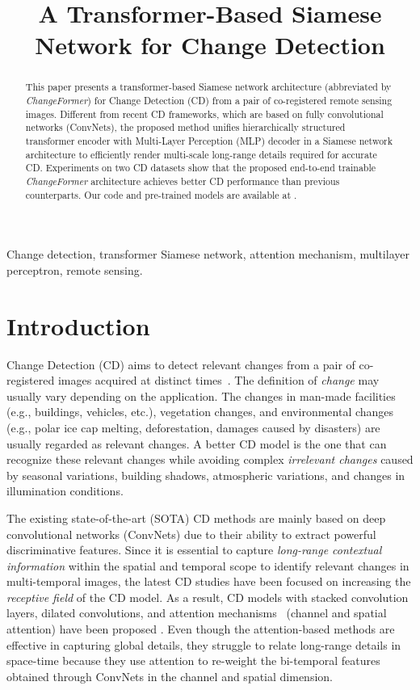 \documentclass{article}
\title{A Transformer-Based Siamese Network for Change Detection}
\def\ChangeFormer{{\textit{ChangeFormer}}}
\begin{document}
\maketitle

\begin{abstract}
This paper presents a transformer-based Siamese network architecture (abbreviated by \ChangeFormer) for Change Detection (CD) from a pair of co-registered remote sensing images. Different from recent CD frameworks, which are based on fully convolutional networks (ConvNets), the proposed method unifies hierarchically structured transformer encoder with Multi-Layer Perception (MLP) decoder in a Siamese network architecture to efficiently render multi-scale long-range details required for accurate CD. Experiments on two CD datasets show that the proposed end-to-end trainable \ChangeFormer{} architecture achieves better CD performance than previous counterparts. Our code and pre-trained models are available at \href{https://github.com/wgcban/ChangeFormer}{\color{blue}{}}.
\end{abstract}

\begin{keywords}
Change detection, transformer Siamese network, attention mechanism, multilayer perceptron, remote sensing.  
\end{keywords}

\section{Introduction}
Change Detection (CD) aims to detect relevant changes from a pair of co-registered images acquired at distinct times~\cite{bandara2022revisiting}. The definition of \textit{change} may usually vary depending on the application. The changes in man-made facilities (e.g., buildings, vehicles, etc.), vegetation changes, and environmental changes (e.g., polar ice cap melting, deforestation, damages caused by disasters) are usually regarded as {relevant changes}. A better CD model is the one that can recognize these relevant changes while avoiding complex \textit{ irrelevant changes} caused by seasonal variations, building shadows, atmospheric variations, and changes in illumination conditions.

The existing state-of-the-art (SOTA) CD methods are mainly based on deep convolutional networks (ConvNets) due to their ability to extract powerful discriminative features. Since it is essential to capture \textit{long-range contextual information} within the spatial and temporal scope to identify relevant changes in multi-temporal images, the latest CD studies have been focused on increasing the \textit{receptive field} of the CD model. As a result, CD models with stacked convolution layers, dilated convolutions, and attention mechanisms~\cite{bandara2021spin} (channel and spatial attention) have been proposed \cite{cd_attention}. Even though the attention-based methods are effective in capturing global details, they struggle to relate long-range details in space-time because they use attention to re-weight the bi-temporal features obtained through ConvNets in the channel and spatial dimension.
\end{document}
